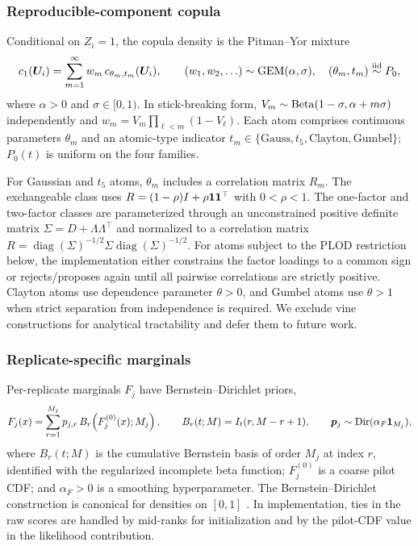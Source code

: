 \subsubsection{Reproducible-component copula}

Conditional on $Z_i = 1$, the copula density is the Pitman--Yor mixture
\begin{equation}
c_1(\bm{U}_i) = \sum_{m=1}^\infty w_m\, c_{\theta_m,t_m}(\bm{U}_i),\qquad
(w_1,w_2,\ldots) \sim \mathrm{GEM}(\alpha,\sigma),\quad (\theta_m,t_m) \stackrel{\mathrm{iid}}{\sim} P_0,
\label{eq:py-mix}
\end{equation}
where $\alpha>0$ and $\sigma\in[0,1)$. In stick-breaking form, $V_m\sim\mathrm{Beta}(1-\sigma,\alpha+m\sigma)$ independently and $w_m=V_m\prod_{\ell<m}(1-V_\ell)$. Each atom comprises continuous parameters $\theta_m$ and an atomic-type indicator $t_m \in \{\text{Gauss}, t_5, \text{Clayton}, \text{Gumbel}\}$; $P_0(t)$ is uniform on the four families.

For Gaussian and $t_5$ atoms, $\theta_m$ includes a correlation matrix $R_m$. The exchangeable class uses $R=(1-\rho)I+\rho\mathbf{1}\mathbf{1}^\top$ with $0<\rho<1$. The one-factor and two-factor classes are parameterized through an unconstrained positive definite matrix $\Sigma=D+\Lambda\Lambda^\top$ and normalized to a correlation matrix $R=\operatorname{diag}(\Sigma)^{-1/2}\Sigma\operatorname{diag}(\Sigma)^{-1/2}$. For atoms subject to the PLOD restriction below, the implementation either constrains the factor loadings to a common sign or rejects/proposes again until all pairwise correlations are strictly positive. Clayton atoms use dependence parameter $\theta>0$, and Gumbel atoms use $\theta>1$ when strict separation from independence is required. We exclude vine constructions for analytical tractability and defer them to future work.

\subsubsection{Replicate-specific marginals}

Per-replicate marginals $F_j$ have Bernstein--Dirichlet priors,
\begin{equation}
F_j(x) = \sum_{r=1}^{M_j} p_{j,r}\, B_r\!\left(F_j^{(0)}(x); M_j\right),\qquad
B_r(t;M)=I_t(r,M-r+1),\qquad \bm p_j\sim\mathrm{Dir}(\alpha_F\mathbf{1}_{M_j}),
\label{eq:bernstein}
\end{equation}
where $B_r(t;M)$ is the cumulative Bernstein basis of order $M_j$ at index $r$, identified with the regularized incomplete beta function; $F_j^{(0)}$ is a coarse pilot CDF; and $\alpha_F>0$ is a smoothing hyperparameter. The Bernstein--Dirichlet construction is canonical for densities on $[0,1]$ \citep{Petrone1999,PetroneWasserman2002}. In implementation, ties in the raw scores are handled by mid-ranks for initialization and by the pilot-CDF value in the likelihood contribution.

